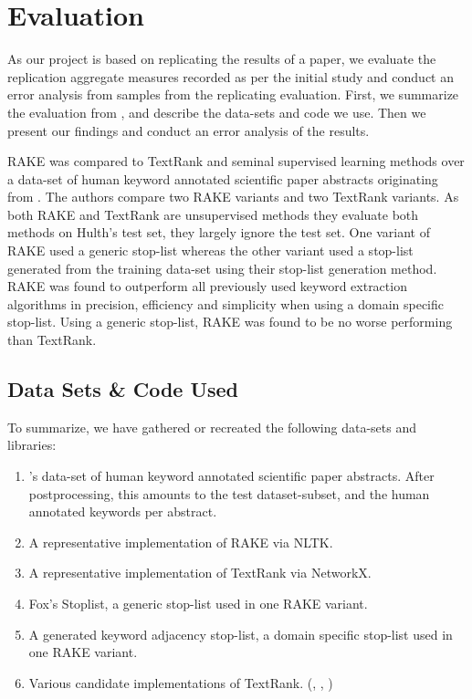 \documentclass[11pt,a4paper]{article}
\begin{document}
\section{Evaluation}

As our project is based on replicating the results of a paper, we evaluate the replication aggregate measures recorded as per the initial study and conduct an error analysis from samples from the replicating evaluation. First, we summarize the evaluation from , and describe the data-sets and code we use. Then we present our findings and conduct an error analysis of the results. 

RAKE was compared to TextRank and seminal supervised learning methods \citep{hulth-2003-improved} over a data-set of human keyword annotated scientific paper abstracts originating from \citet{hulth-2003-improved}. The authors compare two RAKE variants and two TextRank variants. As both RAKE and TextRank are unsupervised methods they evaluate both methods on Hulth's test set, they largely ignore the test set. One variant of RAKE used a generic stop-list whereas the other variant used a stop-list generated from the training data-set using their stop-list generation method. RAKE was found to outperform all previously used keyword extraction algorithms in precision, efficiency and simplicity when using a domain specific stop-list. Using a generic stop-list, RAKE was found to be no worse performing than TextRank.

\subsection{Data Sets \& Code Used}
To summarize, we have gathered or recreated the following data-sets and libraries:

\begin{enumerate}
	\small \itemsep0em 

	\item \citet{hulth-2003-improved}'s data-set of human keyword annotated scientific paper abstracts. After postprocessing, this amounts to the test dataset-subset, and the human annotated keywords per abstract.
	\item A representative implementation of RAKE via NLTK. \citet{2}
	\item A representative implementation of TextRank via NetworkX. \citet{PyTextRank}
	\item Fox's Stoplist, a generic stop-list used in one RAKE variant.
	\item A generated keyword adjacency stop-list, a domain specific stop-list used in one RAKE variant.	
	\item Various candidate implementations of TextRank. (\citet{TextRank-alt1}, \citet{TextRank-alt2}, \citet{TextRank-alt3})

	\normalsize
\end{enumerate}  
\end{document}
